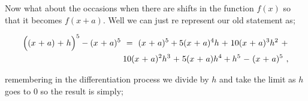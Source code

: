 \documentclass{article}
\begin{document}
Now what about the occasions when there are shifts in the function \begin{math} f(x) \end{math} so that it becomes \begin{math} f(x + a) \end{math}. Well we can just re represent our old statement as;

\begin{equation} \label{eb-eq-320-1}
\begin{aligned}
\Big((x \hspace{0.025cm} + \hspace{0.025cm} a) \hspace{0.025cm} + \hspace{0.025cm} h\Big)^5 - (x \hspace{0.025cm} + \hspace{0.025cm} a)^5 \hspace{0.125cm} = \hspace{0.125cm} (x \hspace{0.025cm} + \hspace{0.025cm} a)^5 + 5(x \hspace{0.025cm} + \hspace{0.025cm} a)^4 h \hspace{0.025cm} + \hspace{0.025cm} 10(x \hspace{0.025cm} + \hspace{0.025cm} a)^3 h^2 \hspace{0.125cm} + \hspace{0.025cm} \\
10(x \hspace{0.025cm} + \hspace{0.025cm} a)^2 h^3 \hspace{0.025cm} + \hspace{0.025cm} 5(x \hspace{0.025cm} + \hspace{0.025cm} a)h^4 + h^5 \hspace{0.025cm} - \hspace{0.025cm} (x \hspace{0.025cm} + \hspace{0.025cm} a)^5 \hspace{0.125cm} ,
\end{aligned}
\end{equation}

remembering in the differentiation process we divide by \begin{math} h \end{math} and take the limit as \begin{math} h \end{math} goes to \begin{math} 0 \end{math} so the result is simply;
\end{document}
